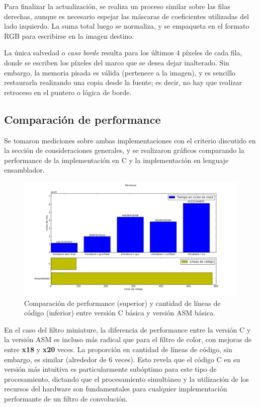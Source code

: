 Para finalizar la actualización, se realiza un proceso similar sobre las filas derechas, aunque es necesario espejar las máscaras de coeficientes utilizadas del lado izquierdo. La suma total luego se normaliza, y se empaqueta en el formato RGB para escribirse en la imagen destino.

La única salvedad o \emph{caso borde} resulta para los últimos 4 píxeles de cada fila, donde se escriben los píxeles del marco que se desea dejar inalterado. Sin embargo, la memoria pisada es válida (pertenece a la imagen), y es sencillo restaurarla realizando una copia desde la fuente; es decir, no hay que realizar retroceso en el puntero o lógica de borde.

\subsection{Comparación de performance}
\label{sub:comparaci_n_de_performance}

Se tomaron mediciones sobre ambas implementaciones con el criterio discutido en la sección de consideraciones generales, y se realizaron gráficos comparando la performance de la implementación en C y la implementación en lenguaje ensamblador.

\begin{figure}[H]
\begin{center}
  \includegraphics[scale=0.5]{secciones/filtro_miniature/graficos/miniature.png}
\end{center}
\caption{Comparación de performance (superior) y cantidad de líneas de código (inferior) entre versión C básica y versión ASM básica.}
\label{fig:filtro-miniature-C-vs-ASM}
\end{figure}

En el caso del filtro miniature, la diferencia de performance entre la versión C y la versión ASM es incluso más radical que para el filtro de color, con mejoras de entre \textbf{x18} y \textbf{x20} veces. La proporción en cantidad de líneas de código, sin embargo, es similar (alrededor de 6 veces). Esto revela que el código C en su versión más intuitiva es particularmente subóptimo para este tipo de procesamiento, dictando que el procesamiento simultáneo y la utilización de los recursos del hardware son fundamentales para cualquier implementación performante de un filtro de convolución.

